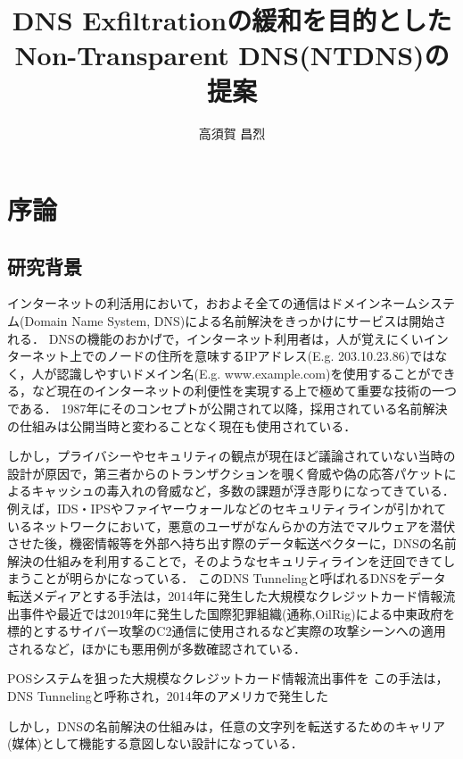 \documentclass[12pt]{jarticle} %
\title{DNS Exfiltrationの緩和を目的としたNon-Transparent DNS(NTDNS)の提案}
\author{高須賀 昌烈}
\begin{document}
\titlepage
\cmemberspage
\firstabstract
\secondabstract



\toc
\newpage
\listoffigures
\listoftables



\newpage
{}
\section{序論}
\subsection{研究背景}
インターネットの利活用において，おおよそ全ての通信はドメインネームシステム(Domain Name System, DNS)による名前解決をきっかけにサービスは開始される．
DNSの機能のおかげで，インターネット利用者は，人が覚えにくいインターネット上でのノードの住所を意味するIPアドレス(E.g. 203.10.23.86)ではなく，人が認識しやすいドメイン名(E.g. www.example.com)を使用することができる，など現在のインターネットの利便性を実現する上で極めて重要な技術の一つである．
1987年にそのコンセプト\cite{rfc1034, rfc1035}が公開されて以降，採用されている名前解決の仕組みは公開当時と変わることなく現在も使用されている．

しかし，プライバシーやセキュリティの観点が現在ほど議論されていない当時の設計が原因で，第三者からのトランザクションを覗く脅威や偽の応答パケットによるキャッシュの毒入れの脅威など，多数の課題が浮き彫りになってきている．
例えば，IDS・IPSやファイヤーウォールなどのセキュリティラインが引かれているネットワークにおいて，悪意のユーザがなんらかの方法でマルウェアを潜伏させた後，機密情報等を外部へ持ち出す際のデータ転送ベクターに，DNSの名前解決の仕組みを利用することで，そのようなセキュリティラインを迂回できてしまうことが明らかになっている．
このDNS Tunnelingと呼ばれるDNSをデータ転送メディアとする手法は，2014年に発生した大規模なクレジットカード情報流出事件\cite{frameworkpos}や最近では2019年に発生した国際犯罪組織(通称,OilRig)による中東政府を標的とするサイバー攻撃のC2通信に使用されるなど実際の攻撃シーンへの適用される\cite{bondupdater}など，ほかにも悪用例が多数確認されている\cite{bernhardpos, multigrainpos, pisloader, denis, dnsmessenger, udpos}．


POSシステムを狙った大規模なクレジットカード情報流出事件を
この手法は，DNS Tunnelingと呼称され，2014年のアメリカで発生した

しかし，DNSの名前解決の仕組みは，任意の文字列を転送するためのキャリア(媒体)として機能する意図しない設計になっている．
\end{document}
